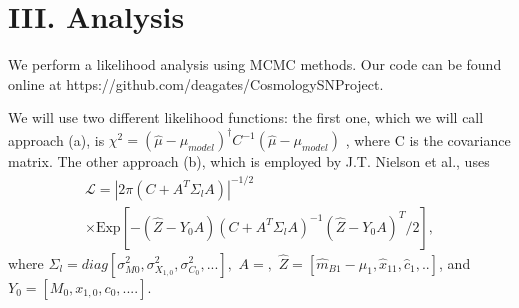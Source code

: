 \documentclass[aps,prl,reprint]{revtex4-1}
\begin{document}
\section{III. Analysis}
We perform a likelihood analysis using MCMC methods. Our code can be found online at https://github.com/deagates/CosmologySNProject.
\par We will use two different likelihood functions: the first one, which we will call approach (a), is $\chi^2 = (\hat{\mu}-\mu_{model})^\dagger C^{-1} (\hat{\mu}-\mu_{model})$ \cite{sdss}, where C is the covariance matrix. The other approach (b), which is employed by J.T. Nielson et al., uses \begin{align*}\mathscr{L} = |2\pi(C+A^T \Sigma_l A)|^{-1/2}\; \\
\times \text{Exp}[-(\hat{Z}-Y_0A)(C+A^T\Sigma_lA)^{-1}(\hat{Z}-Y_0A)^T/2],\end{align*} where $\Sigma_l = diag[\sigma_{M0}^2,\sigma_{X_{1,0}}^2,\sigma_{C_0}^2,...],$ $A = ,$ $\hat{Z} = [\hat{m}_{B1}-\mu_1, \hat{x}_{11},\hat{c}_1,..]$, and $Y_0 = [M_0,x_{1,0},c_0,....]$. 
 
\end{document}
